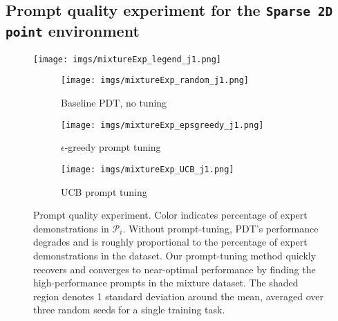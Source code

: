 \documentclass{article} %
\begin{document}
\subsection{Prompt quality experiment for the \texttt{Sparse 2D point} environment}\label{app:plots_prompt_quality}
\begin{figure*}[h!]
    \centering
    \texttt{[image: imgs/mixtureExp\_legend\_j1.png]}
    \vfill
    \begin{subfigure}{0.3\textwidth}
        \texttt{[image: imgs/mixtureExp\_random\_j1.png]}
        \caption{Baseline PDT, no tuning}
        \label{fig:mixture-no-tuning}
    \end{subfigure}
    \hfill
    \begin{subfigure}{0.3\textwidth}
        \texttt{[image: imgs/mixtureExp\_epsgreedy\_j1.png]}
        \caption{$\epsilon$-greedy prompt tuning}
        \label{fig:mixture-eps-greedy}
    \end{subfigure}
        \hfill
    \begin{subfigure}{0.3\textwidth}
        \texttt{[image: imgs/mixtureExp\_UCB\_j1.png]}
        \caption{UCB prompt tuning}
        \label{fig:mixture-ucb}
    \end{subfigure}
    \caption{Prompt quality experiment. Color indicates percentage of expert demonstrations in $\mathcal{P}_i$. Without prompt-tuning, PDT's performance degrades and is roughly proportional to the percentage of expert demonstrations in the dataset. Our prompt-tuning method quickly recovers and converges to near-optimal performance by finding the high-performance prompts in the mixture dataset. The shaded region denotes 1 standard deviation around the mean, averaged over three random seeds for a single training task.}
    \label{fig:results-mixture-exp}
\end{figure*}
\end{document}
